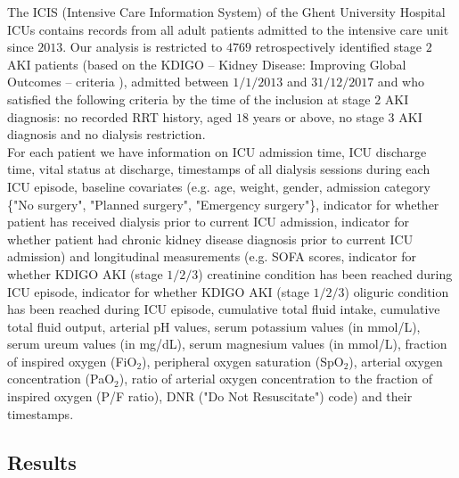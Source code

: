 \documentclass[12pt]{article}
\begin{document}
The ICIS (Intensive Care Information System) of the Ghent University Hospital ICUs contains records from all adult patients admitted to the intensive care unit since $2013$. Our analysis is restricted to $4769$ retrospectively identified stage $2$ AKI patients \citep{Vanmassenhove2021} (based on the KDIGO -- Kidney Disease: Improving Global Outcomes -- criteria \citep{KDIGO2012}), admitted between $1/1/2013$ and $31/12/2017$ and who satisfied the following criteria by the time of the inclusion at stage $2$ AKI diagnosis: no recorded RRT history, aged $18$ years or above, no stage $3$ AKI diagnosis and no dialysis restriction. 
\\
\indent
For each patient we have information on ICU admission time, ICU discharge time, vital status at discharge, timestamps of all dialysis sessions during each ICU episode, baseline covariates (e.g. age, weight, gender, admission category \{"No surgery", "Planned surgery", "Emergency surgery"\}, indicator for whether patient has received dialysis prior to current ICU admission, indicator for whether patient had chronic kidney disease diagnosis prior to current ICU admission) and longitudinal measurements (e.g. SOFA scores, indicator for whether KDIGO AKI (stage $1/2/3$) creatinine condition has been reached during ICU episode, indicator for whether KDIGO AKI (stage $1/2/3$) oliguric condition has been reached during ICU episode, cumulative total fluid intake, cumulative total fluid output, arterial pH values, serum potassium values (in mmol/L), serum ureum values (in mg/dL), serum magnesium values (in mmol/L), fraction of inspired oxygen (FiO$_2$), peripheral oxygen saturation (SpO$_2$), arterial oxygen concentration (PaO$_2$), ratio of arterial oxygen concentration to the fraction of inspired oxygen (P/F ratio), DNR ("Do Not Resuscitate") code) and their timestamps. 

\subsection{Results}
\end{document}
